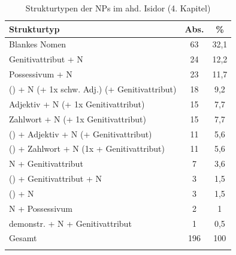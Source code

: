 \begin{table}
\centering
\caption{Strukturtypen der NPs im ahd. Isidor (4. Kapitel) \parencite{Flick2018}}
\label{NP-Flick}
\begin{tabular}{lS[table-format=2.0]S[table-format=2.1]}
\lsptoprule
{Strukturtyp}                                   & {Abs.} & {\%}  \\ \midrule
Blankes Nomen                                          & 63            & 32,1         \\
Genitivattribut + N                                    & 24            & 12,2         \\
Possessivum + N                                          & 23            & 11,7         \\
 () + N (+ 1x schw. Adj.) (+ Genitivattribut) & 18            & 9,2          \\
Adjektiv + N (+ 1x Genitivattribut)                    & 15            & 7,7          \\
Zahlwort + N (+ 1x Genitivattribut)                    & 15            & 7,7          \\
 () + Adjektiv + N (+ Genitivattribut)        & 11            & 5,6          \\
 () + Zahlwort + N (1x + Genitivattribut)     & 11            & 5,6          \\
N + Genitivattribut                                    & 7             & 3,6          \\
 () + Genitivattribut + N                     & 3             & 1,5          \\
 () + N                                     & 3             & 1,5          \\
N + Possessivum                                          & 2             & 1            \\
demonstr.  + N + Genitivattribut                   & 1             & 0,5          \\\midrule
{Gesamt}                                        & {196}  & {100} \\ \lspbottomrule
\end{tabular}
\end{table}


